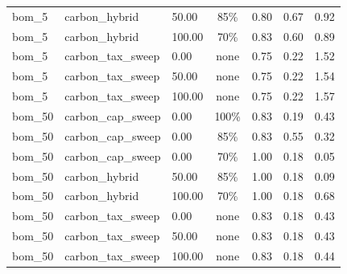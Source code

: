 \begin{table}[!htbp]
\begin{tabular}{lllcccc}
bom\_5 & carbon\_hybrid & 50.00 & 85\% & 0.80 & 0.67 & 0.92 \\
bom\_5 & carbon\_hybrid & 100.00 & 70\% & 0.83 & 0.60 & 0.89 \\
bom\_5 & carbon\_tax\_sweep & 0.00 & none & 0.75 & 0.22 & 1.52 \\
bom\_5 & carbon\_tax\_sweep & 50.00 & none & 0.75 & 0.22 & 1.54 \\
bom\_5 & carbon\_tax\_sweep & 100.00 & none & 0.75 & 0.22 & 1.57 \\
bom\_50 & carbon\_cap\_sweep & 0.00 & 100\% & 0.83 & 0.19 & 0.43 \\
bom\_50 & carbon\_cap\_sweep & 0.00 & 85\% & 0.83 & 0.55 & 0.32 \\
bom\_50 & carbon\_cap\_sweep & 0.00 & 70\% & 1.00 & 0.18 & 0.05 \\
bom\_50 & carbon\_hybrid & 50.00 & 85\% & 1.00 & 0.18 & 0.09 \\
bom\_50 & carbon\_hybrid & 100.00 & 70\% & 1.00 & 0.18 & 0.68 \\
bom\_50 & carbon\_tax\_sweep & 0.00 & none & 0.83 & 0.18 & 0.43 \\
bom\_50 & carbon\_tax\_sweep & 50.00 & none & 0.83 & 0.18 & 0.43 \\
bom\_50 & carbon\_tax\_sweep & 100.00 & none & 0.83 & 0.18 & 0.44 \\
\bottomrule
\end{tabular}
\end{table}
